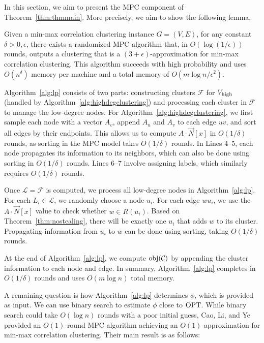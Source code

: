In this section, we aim to present the MPC component of Theorem~\ref{thm:thmmain}. More precisely, we aim to show the following lemma,

\begin{lemma}
\label{lemma:mainresultmpc}
Given a min-max correlation clustering instance $G = (V, E)$, for any constant $\delta > 0, \epsilon$, there exists a randomized MPC algorithm that, in $O(\log(1/\epsilon))$ rounds, outputs a clustering that is a $(3 + \epsilon)$-approximation for min-max correlation clustering. This algorithm succeeds with high probability and uses $O(n^{\delta})$ memory per machine and a total memory of $O(m \log n / \epsilon^2)$.
\end{lemma}

Algorithm~\ref{alg:lp} consists of two parts: constructing clusters $\mathcal{F}$ for $V_{\operatorname{high}}$ (handled by Algorithm~\ref{alg:highdegclustering}) and processing each cluster in $\mathcal{F}$ to manage the low-degree nodes. For Algorithm~\ref{alg:highdegclustering}, we first sample each node with a vector $A_v$, append $A_u$ and $A_v$ to each edge $uv$, and sort all edges by their endpoints. This allows us to compute $A \cdot \vec{N}[x]$ in $O(1 /\delta)$ rounds, as sorting in the MPC model takes $O(1/\delta)$ rounds. In Lines 4--5, each node propagates its information to its neighbors, which can also be done using sorting in $O(1/\delta)$ rounds. Lines 6--7 involve assigning labels, which similarly requires $O(1/\delta)$ rounds.

Once $\mathcal{L} = \mathcal{F}$ is computed, we process all low-degree nodes in Algorithm~\ref{alg:lp}. For each $L_i \in \mathcal{L}$, we randomly choose a node $u_i$. For each edge $wu_i$, we use the $A \cdot \vec{N}[x]$ value to check whether $w \in R(u_i)$. Based on Theorem~\ref{thm:nostealing}, there will be exactly one $u_i$ that adds $w$ to its cluster. Propagating information from $u_i$ to $w$ can be done using sorting, taking $O(1/\delta)$ rounds. 

At the end of Algorithm~\ref{alg:lp}, we compute $\mathrm{obj}(\mathcal{C})$ by appending the cluster information to each node and edge. In summary, Algorithm~\ref{alg:lp} completes in $O(1/\delta)$ rounds and uses $O(m \log n)$ total memory.


A remaining question is how Algorithm~\ref{alg:lp} determines $\phi$, which is provided as input. We can use binary search to estimate $\phi$ close to $\mathrm{OPT}$. While binary search could take $O(\log n)$ rounds with a poor initial guess, Cao, Li, and Ye~\cite{cao2024simultaneously} provided an $O(1)$-round MPC algorithm achieving an $O(1)$-approximation for min-max correlation clustering. Their main result is as follows:

